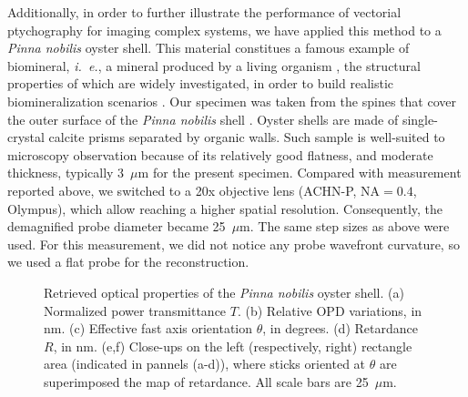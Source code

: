\documentclass[aps,prl,twocolumn,amsmath]{revtex4-1}
\begin{document}
Additionally, in order to further illustrate the performance of vectorial ptychography for imaging complex systems, we have applied this method to a \emph{Pinna nobilis} oyster shell. This material constitues a famous example of biomineral, \emph{i.~e.}, a mineral produced by a living organism \cite{Cuif_biominerals_2011}, the structural properties of which are widely investigated, in order to build realistic biomineralization scenarios \cite{wolf_2013,mastropietro2017}. Our specimen was taken from the spines that cover the outer surface of the \emph{Pinna nobilis} shell \cite{Marin_2011}. Oyster shells are made of single-crystal calcite prisms separated by organic walls. Such sample is well-suited to microscopy observation because of its relatively good flatness, and moderate thickness, typically 3~$\mu$m for the present specimen. Compared with measurement reported above, we switched to a 20x objective lens (ACHN-P, NA$=0.4$, Olympus), which allow reaching a higher spatial resolution. Consequently, the demagnified probe diameter became 25~$\mu$m. The same step sizes as above were used. For this measurement, we did not notice any probe wavefront curvature, so we used a flat probe for the reconstruction. 

\begin{figure}[!h]
\centering
{}
\caption{Retrieved optical properties of the \emph{Pinna nobilis} oyster shell. (a) Normalized power transmittance $T$. (b) Relative OPD variations, in nm. (c) Effective fast axis orientation $\theta$, in degrees. (d) Retardance $R$, in nm. (e,f) Close-ups on the left (respectively, right) rectangle area (indicated in pannels (a-d)), where sticks oriented at $\theta$ are superimposed the map of retardance. All scale bars are 25~$\mu$m.}
\label{fig:Fig05}
\end{figure}
\end{document}
